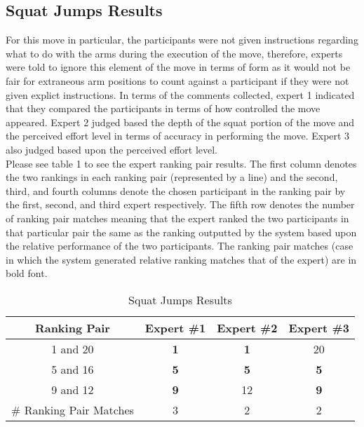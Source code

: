 \subsection{Squat Jumps Results}
For this move in particular, the participants were not given instructions regarding what to do with the arms during the execution of the move, therefore, experts were told to ignore this element of the move in terms of form as it would not be fair for extraneous arm positions to count against a participant if they were not given explict instructions.  In terms of the comments collected, expert 1 indicated that they compared the participants in terms of how controlled the move appeared.  Expert 2 judged based the depth of the squat portion of the move and the perceived effort level in terms of accuracy in performing the move.  Expert 3 also judged based upon the perceived effort level.\\
Please see table 1 to see the expert ranking pair results.  The first column denotes the two rankings in each ranking pair (represented by a line) and the second, third, and fourth columns denote the chosen participant in the ranking pair by the first, second, and third expert respectively.  The fifth row denotes the number of ranking pair matches meaning that the expert ranked the two participants in that particular pair the same as the ranking outputted by the system based upon the relative performance of the two participants. The ranking pair matches (case in which the system generated relative ranking matches that of the expert) are in bold font.\\

\begin{table}[h!]
\caption{Squat Jumps Results}
\centering
\begin{tabular}{c c c c}
\hline \hline
Ranking Pair & Expert \#1 & Expert \#2 & Expert \#3 \\ [0.5ex]
\hline
1 and 20 &		\textbf{1}&		\textbf{1}&		20 \\
5 and 16 &		\textbf{5}&		\textbf{5}&		\textbf{5} \\
9 and 12 &		\textbf{9}&		12&				\textbf{9} \\
\hline
\# Ranking Pair Matches &		3&		2&		2 \\
\end{tabular}
\label{table:squatjumpsresult}
\end{table}

